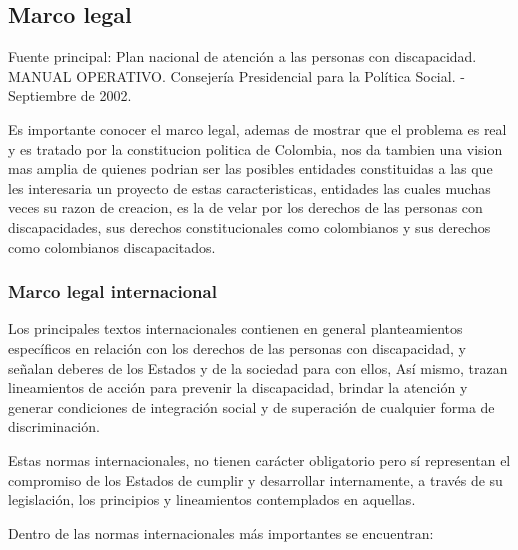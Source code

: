\documentclass[a4paper, 12pt, oneside]{article}
\begin{document}
		
	\subsection{Marco legal}

	Fuente principal: Plan nacional de atención a las personas con discapacidad. MANUAL OPERATIVO. Consejería Presidencial para la Política Social. - Septiembre de 2002.

	Es importante conocer el marco legal, ademas de mostrar que el problema es real y es tratado por la constitucion politica de Colombia, nos da tambien una vision mas amplia de quienes podrian ser las posibles entidades constituidas a las que les interesaria un proyecto de estas caracteristicas, entidades las cuales muchas veces su razon de creacion, es la de velar por los derechos de las personas con discapacidades, sus derechos constitucionales como colombianos y sus derechos como colombianos discapacitados. 


	\subsubsection{Marco legal internacional}

	Los principales textos internacionales contienen en general planteamientos específicos en relación con los derechos de las personas con discapacidad, y señalan deberes de los Estados y de la sociedad para con ellos, Así mismo, trazan lineamientos de acción para prevenir la discapacidad, brindar la atención y generar condiciones de integración social y de superación de cualquier forma de discriminación.

	Estas normas internacionales, no tienen carácter obligatorio pero sí representan el compromiso de los Estados de cumplir y desarrollar internamente, a través de su legislación, los principios y lineamientos contemplados en aquellas.

	Dentro de las normas internacionales más importantes se encuentran:
\end{document}
